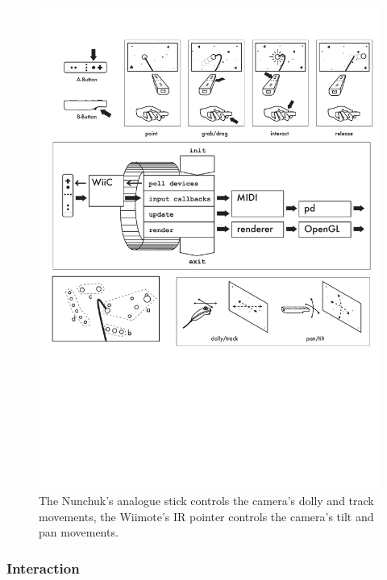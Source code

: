 \documentclass[10pt,a4paper]{scrartcl}
\begin{document}
\begin{figure}[hbtp]
\begin{center}
\includegraphics[width=0.7\columnwidth]{img/navigation}
\caption{The Nunchuk's analogue stick controls the camera's dolly and track movements, the Wiimote's IR pointer controls the camera's tilt and pan movements.}
\label{fig:sputnik-navigation}
\end{center}
\end{figure}




\subsubsection{Interaction}
\end{document}
